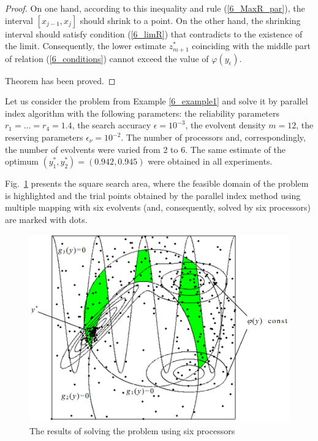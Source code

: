 \begin{proof}
On one hand, according to this inequality and rule (\ref{6_MaxR_par}), the interval $[x_{j-1},x_j]$ should shrink to a point. On the other hand, the shrinking interval should satisfy condition (\ref{6_limR}) that contradicts to the existence of the limit. Consequently, the lower estimate $z_{m+1}^\ast$  coinciding with the middle part of relation  (\ref{6_conditions}) cannot exceed the value of $\varphi(y_\epsilon)$. 

Theorem has been proved.

\end{proof}

\begin{example}
Let us consider the problem from Example \ref{6_example1} and solve it by parallel index algorithm with the following parameters: the reliability parameters $r_1=...=r_4=1.4$, the search accuracy $\epsilon=10^{-3}$, the evolvent density $m=12$, the reserving parameters $\epsilon_\nu=10^{-2}$. The number of processors and, correspondingly, the number of evolvents were varied from 2 to 6. The same estimate of the optimum $(y_1^\ast,y_2^\ast) =(0.942, 0.945)$ were obtained in all experiments.

Fig.~\ref{6_fig_8} presents the square search area, where the feasible domain of the problem is highlighted and the trial points obtained by the parallel index method using multiple mapping with six evolvents (and, consequently, solved by six processors) are marked with dots.

\begin{figure}[t]
\includegraphics[width=0.8\linewidth]{figures/6_8.png}
\caption{The results of solving the problem using six processors}
\label{6_fig_8}     
\end{figure}
\end{example}

